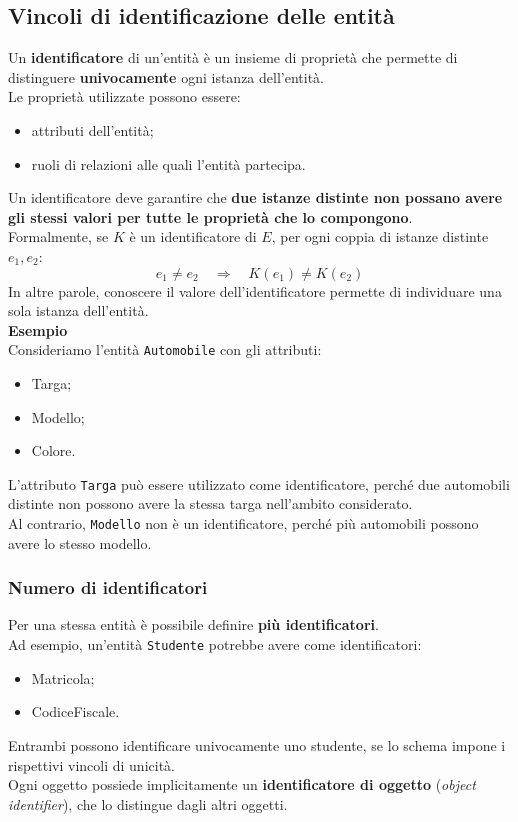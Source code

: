 \subsection{Vincoli di identificazione delle entità}
Un \textbf{identificatore} di un'entità è un insieme
di proprietà che permette di distinguere
\textbf{univocamente} ogni istanza dell'entità.\\
Le proprietà utilizzate possono essere:
\begin{itemize}
    \item attributi dell'entità;
    \item ruoli di relazioni alle quali l'entità partecipa.
\end{itemize}
\noindent
Un identificatore deve garantire che
\textbf{due istanze distinte non possano avere
gli stessi valori per tutte le proprietà
che lo compongono}.\\
Formalmente, se $K$ è un identificatore di $E$,
per ogni coppia di istanze distinte $e_1,e_2$:
\[
e_1\neq e_2
\quad\Longrightarrow\quad
K(e_1)\neq K(e_2)
\]
In altre parole, conoscere il valore
dell'identificatore permette di individuare
una sola istanza dell'entità.\\
\textcolor{verdeEsempio}{\textbf{Esempio}}\\
Consideriamo l'entità \texttt{Automobile}
con gli attributi:
\begin{itemize}
    \item Targa;
    \item Modello;
    \item Colore.
\end{itemize}
\noindent
L'attributo \texttt{Targa} può essere utilizzato
come identificatore, perché due automobili distinte
non possono avere la stessa targa
nell'ambito considerato.\\
Al contrario, \texttt{Modello} non è un identificatore,
perché più automobili possono avere lo stesso modello.

\subsubsection*{Numero di identificatori}
Per una stessa entità è possibile definire
\textbf{più identificatori}.\\
Ad esempio, un'entità \texttt{Studente}
potrebbe avere come identificatori:
\begin{itemize}
    \item Matricola;
    \item CodiceFiscale.
\end{itemize}
\noindent
Entrambi possono identificare univocamente
uno studente, se lo schema impone
i rispettivi vincoli di unicità.\\
Ogni oggetto possiede implicitamente
un \textbf{identificatore di oggetto}
(\emph{object identifier}), che lo distingue
dagli altri oggetti.
